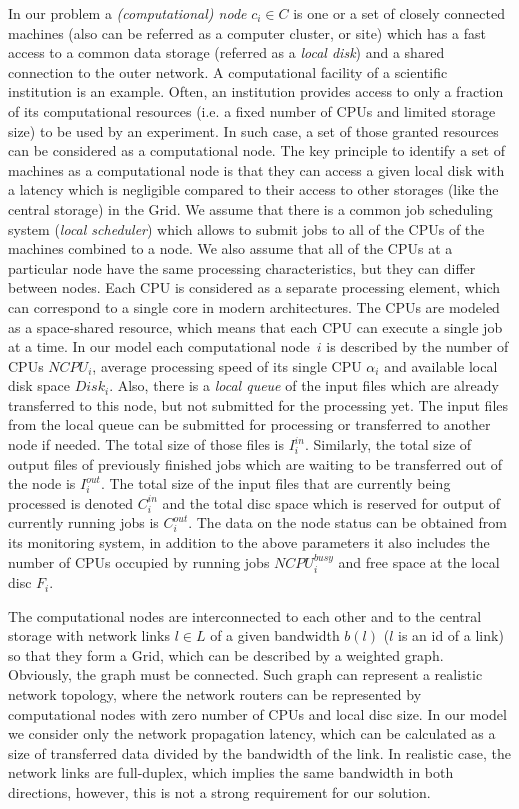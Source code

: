 \documentclass{svjour3}                     %
\begin{document}
In our problem a \textit{(computational) node} $c_i \in C$ is one or a set of closely connected machines (also can be referred as a computer cluster, or site) which has a fast access to a common data storage (referred as a \textit{local disk}) and a shared connection to the outer network. A computational facility of a scientific institution is an example. Often, an institution provides  access to only a fraction of its computational resources (i.e. a fixed number of CPUs and limited storage size) to be used by an experiment. In such case, a set of those granted resources can be considered as a computational node. The key principle to identify a set of machines as a computational node is that they can access a given local disk with a latency which is negligible compared to their access to other storages (like the central storage) in the Grid. We assume that there is a common job scheduling system ({\it local scheduler}) which allows to submit jobs to all of the CPUs of the machines combined to a node. We also assume that all of the CPUs at a particular node have the same processing characteristics, but they can differ between nodes. Each CPU is considered as a separate processing element, which can correspond to a single core in modern architectures. The CPUs are modeled as a space-shared resource, which means that each CPU can execute a single job at a time. In our model each computational node~$i$ is described by the number of CPUs $NCPU_{i}$, average processing speed of its single CPU $\alpha_{i}$ and available local disk space $Disk_{i}$. Also, there is a \textit{local queue} of the input files which are already transferred to this node, but not submitted for the processing yet. The input files from the local queue can be submitted for processing or transferred to another node if needed. The total size of those files is $I_{i}^{in}$. Similarly, the total size of output files of previously finished jobs which are waiting to be transferred out of the node is $I_{i}^{out}$. The total size of the input files that are currently being processed is denoted $C_{i}^{in}$ and the total disc space which is reserved for output of currently running jobs is $C_{i}^{out}$. The data on the node status can be obtained from its monitoring system, in addition to the above parameters it also includes the number of CPUs occupied by running jobs $NCPU_{i}^{busy}$ and free space at the local disc $F_{i}$.

The computational nodes are interconnected to each other and to the central storage with network links $l \in L$ of a given bandwidth $b(l)$ ($l$ is an id of a link) so that they form a Grid, which can be described by a weighted graph. Obviously, the graph must be connected. Such graph can represent a realistic network topology, where the network routers can be represented by computational nodes with zero number of CPUs and local disc size. In our model we consider only the network propagation latency, which can be calculated as a size of transferred data divided by the bandwidth of the link. In realistic case, the network links are full-duplex, which implies the same bandwidth in both directions, however, this is not a strong requirement for our solution.
\end{document}
